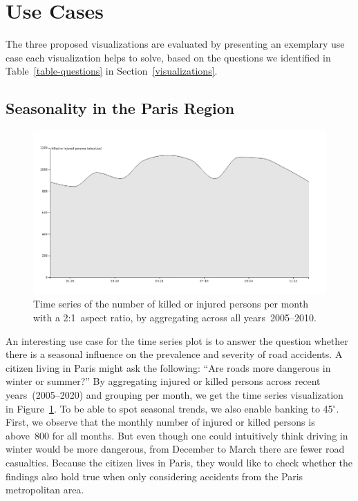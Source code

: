 \section{Use Cases}
The three proposed visualizations are evaluated by presenting an exemplary use case each visualization helps to solve, based on the questions we identified in Table~\ref{table-questions} in Section~\ref{visualizations}.

\subsection{Seasonality in the Paris Region}
\begin{figure}
    \centering
    \includegraphics[width=0.9\linewidth]{figures/time-series-2-to-1-killed-or-injured-absolute-by-year-per-month.png}
    \caption{Time series of the number of killed or injured persons per month with a 2:1~aspect ratio, by aggregating across all years~2005--2010.}
    \label{figure-time-series-killed-injured-by-year-per-month}
\end{figure}
An interesting use case for the time series plot is to answer the question whether there is a seasonal influence on the prevalence and severity of road accidents. A citizen living in Paris might ask the following: \enquote{Are roads more dangerous in winter or summer?}
By aggregating injured or killed persons across recent years~(2005--2020) and grouping per month, we get the time series visualization in Figure~\ref{figure-time-series-killed-injured-by-year-per-month}. To be able to spot seasonal trends, we also enable banking to 45\(^\circ\). First, we observe that the monthly number of injured or killed persons is above~800 for all months. But even though one could intuitively think driving in winter would be more dangerous, from December to March there are fewer road casualties.
Because the citizen lives in Paris, they would like to check whether the findings also hold true when only considering accidents from the Paris metropolitan area.
